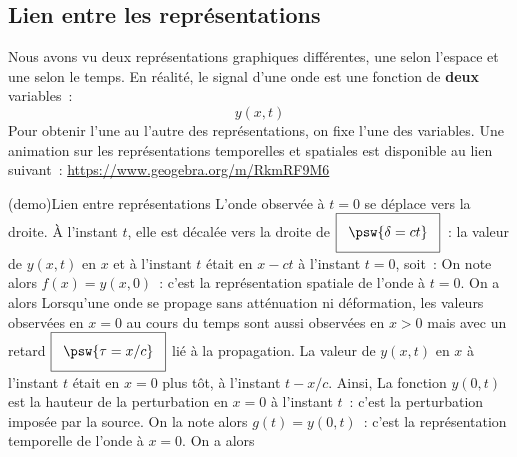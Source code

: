\documentclass[../../main/main.tex]{subfiles}
\begin{document}
\subsection{Lien entre les représentations}
Nous avons vu deux représentations graphiques différentes, une selon l'espace et
une selon le temps. En réalité, le signal d'une onde est une fonction de
\textbf{deux} variables~:
\[y(x,t)\]
Pour obtenir l'une au l'autre des représentations, on fixe l'une des variables.
Une animation sur les représentations temporelles et spatiales est disponible au
lien suivant~: \url{https://www.geogebra.org/m/RkmRF9M6}

\begin{tcb*}(demo){Lien entre représentations}
	L'onde observée à $t=0$ se déplace vers la droite. À l'instant $t$, elle est
	décalée vers la droite de $\setlength{\fboxsep}{3mm} \boxed{\psw{\delta =
				ct}}$~: la valeur de $y(x,t)$ en $x$ et à l'instant $t$ était en $x-ct$ à
	l'instant $t=0$, soit~:
	\psw{%
		\[
			y(x,t) = y(x-ct,0)
		\]
	}
	On note alors $f(x) = y(x,0)$~: c'est la représentation spatiale de l'onde à
	$t=0$. On a alors
	\psw{%
		\[\boxed{
				y(x,t) = f(x-ct)
			}\]
	}
	\vspace{-15pt}
	\tcblower
	Lorsqu'une onde se propage sans atténuation ni déformation, les valeurs
	observées en $x = 0$ au cours du temps sont aussi observées en $x > 0$ mais avec
	un retard $\setlength{\fboxsep}{3mm}\boxed{\psw{\tau = x/c}}$ lié à la propagation.
	La valeur de $y(x, t)$ en $x$ à l'instant $t$ était en $x = 0$ plus tôt, à
	l'instant $t - x/c$. Ainsi,
	\psw{%
		\[
			y(x,t) = y\left(0,t-\frac{x}{c}\right)
		\]
	}
	La fonction $y(0,t)$ est la hauteur de la perturbation en $x=0$ à l'instant
	$t$~: c'est la perturbation imposée par la source. On la note alors $g(t) =
		y(0,t)$~: c'est la représentation temporelle de l'onde à $x=0$. On a alors
	\psw{%
		\[\boxed{
				y(x,t) = g\left(t-\frac{x}{c}\right)
			}\]
	}
\end{tcb*}
\end{document}
